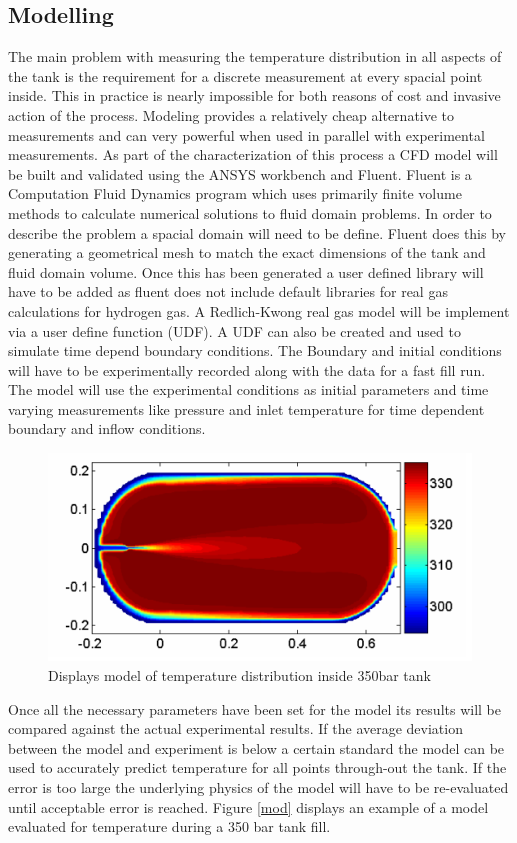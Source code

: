 \documentclass[paper=a4, fontsize=11pt, abstract=on]{scrartcl}
\numberwithin{equation}{section}		%
\numberwithin{figure}{section}			%
\numberwithin{table}{section}				%
\begin{document}
\subsection{Modelling}
The main problem with measuring the temperature distribution in all aspects of the tank is the requirement for a discrete measurement at every spacial point inside. This in practice is nearly impossible for both reasons of cost and invasive action of the process. Modeling provides a relatively cheap alternative to measurements and can very powerful when used in parallel with experimental measurements. As part of the characterization of this process a CFD model will be built and validated using the ANSYS workbench and Fluent. Fluent is a Computation Fluid Dynamics program which uses primarily finite volume methods to calculate numerical solutions to fluid domain problems. In order to describe the problem a spacial domain will need to be define. Fluent does this by generating a geometrical mesh to match the exact dimensions of the tank and fluid domain volume. Once this has been generated a user defined library will have to be added as fluent does not include default libraries for real gas calculations for hydrogen gas. A Redlich-Kwong real gas model will be implement via a user define function (UDF). A UDF can also be created and used to simulate time depend boundary conditions. The Boundary and initial conditions will have to be experimentally recorded along with the data for a fast fill run. The model will use the experimental conditions as initial parameters and time varying measurements like pressure and inlet temperature for time dependent boundary and inflow conditions. 
\begin{figure}[H]
\centering
\includegraphics[width=0.8\linewidth]{mod1}
\caption{Displays model of temperature distribution inside 350bar tank \cite{dick}}
\label{comp}
\end{figure}
Once all the necessary parameters have been set for the model its results will be compared against the actual experimental results. If the average deviation between the model and experiment is below a certain standard the model can be used to accurately predict temperature for all points through-out the tank. If the error is too large the underlying physics of the model will have to be re-evaluated until acceptable error is reached. Figure \ref{mod} displays an example of a model evaluated for temperature during a 350 bar tank fill.
\end{document}
